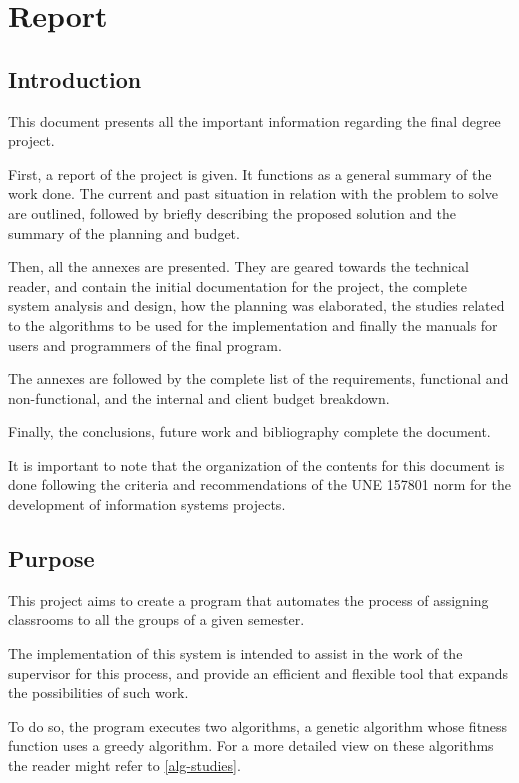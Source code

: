 \renewcommand{\documentname}{Report}

\chapter{Report}

\section{Introduction}

This document presents all the important information regarding the \tfg final degree project.

First, a report of the project is given. It functions as a general summary of the work done. The current and past situation in relation with the problem to solve are outlined, followed by briefly describing the proposed solution and the summary of the planning and budget.

Then, all the annexes are presented. They are geared towards the technical reader, and contain the initial documentation for the project, the complete system analysis and design, how the planning was elaborated, the studies related to the algorithms to be used for the implementation and finally the manuals for users and programmers of the final program.

The annexes are followed by the complete list of the requirements, functional and non-functional, and the internal and client budget breakdown.

Finally, the conclusions, future work and bibliography complete the document.

It is important to note that the organization of the contents for this document is done following the criteria and recommendations of the UNE 157801 norm for the development of information systems projects.

\section{Purpose}

This project aims to create a program that automates the process of assigning classrooms to all the groups of a given semester.

The implementation of this system is intended to assist in the work of the supervisor for this process, and provide an efficient and flexible tool that expands the possibilities of such work.

To do so, the program executes two algorithms, a genetic algorithm whose fitness function uses a greedy algorithm. For a more detailed view on these algorithms the reader might refer to \ref{alg-studies}.

